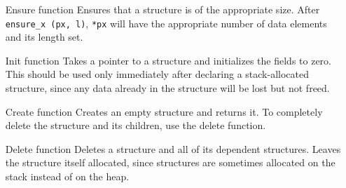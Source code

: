 \documentclass{article}
\begin{document}
      \begin{enumerate}
        \item[Ensure function]
        Ensures that a structure is of the appropriate size. After
        \verb|ensure_x (px, l)|, \verb|*px| will have the appropriate number of
        data elements and its length set.

	\item[Init function]
	Takes a pointer to a structure and initializes the fields to zero. This
	should be used only immediately after declaring a stack-allocated
	structure, since any data already in the structure will be lost but not
	freed.

        \item[Create function]
        Creates an empty structure and returns it. To completely delete the
        structure and its children, use the delete function.

        \item[Delete function]
        Deletes a structure and all of its dependent structures. Leaves the
        structure itself allocated, since structures are sometimes allocated on
        the stack instead of on the heap.
      \end{enumerate}
\end{document}

